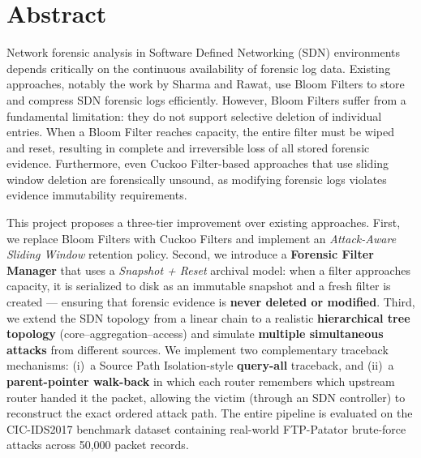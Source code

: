 \documentclass[12pt, a4paper]{report}
\begin{document}
\newpage
\thispagestyle{plain}
\chapter*{Abstract}

Network forensic analysis in Software Defined Networking (SDN) environments
depends critically on the continuous availability of forensic log data.
Existing approaches, notably the work by Sharma and Rawat, use Bloom Filters
to store and compress SDN forensic logs efficiently. However, Bloom Filters
suffer from a fundamental limitation: they do not support selective deletion
of individual entries. When a Bloom Filter reaches capacity, the entire filter
must be wiped and reset, resulting in complete and irreversible loss of all
stored forensic evidence. Furthermore, even Cuckoo Filter-based approaches
that use sliding window deletion are forensically unsound, as modifying
forensic logs violates evidence immutability requirements.

This project proposes a three-tier improvement over existing approaches.
First, we replace Bloom Filters with Cuckoo Filters and implement an
\textit{Attack-Aware Sliding Window} retention policy. Second, we introduce
a \textbf{Forensic Filter Manager} that uses a \textit{Snapshot + Reset}
archival model: when a filter approaches capacity, it is serialized to disk
as an immutable snapshot and a fresh filter is created --- ensuring that
forensic evidence is \textbf{never deleted or modified}. Third, we extend
the SDN topology from a linear chain to a realistic \textbf{hierarchical
tree topology} (core--aggregation--access) and simulate
\textbf{multiple simultaneous attacks} from different sources.
We implement two complementary traceback mechanisms: (i)~a Source Path
Isolation-style \textbf{query-all} traceback, and (ii)~a
\textbf{parent-pointer walk-back} in which each router remembers which
upstream router handed it the packet, allowing the victim (through an SDN
controller) to reconstruct the exact ordered attack path. The entire pipeline
is evaluated on the CIC-IDS2017 benchmark dataset containing real-world
FTP-Patator brute-force attacks across 50,000 packet records.
\end{document}
